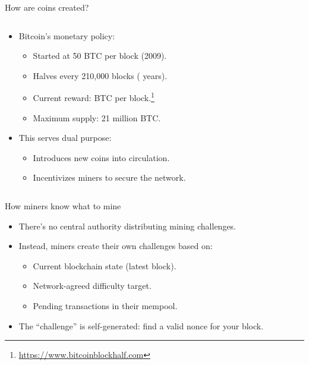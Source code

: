 \documentclass[aspectratio=169, lualatex, handout]{beamer}
\begin{document}
\begin{frame}{How are coins created?}
	\begin{columns}[c]
		\begin{column}{1\textwidth}
			\begin{itemize}
				\item Bitcoin's monetary policy:
				      \begin{itemize}
					      \item Started at 50 BTC per block (2009).
					      \item Halves every 210,000 blocks ( years).
					      \item Current reward:  BTC per block.\footnote{\url{https://www.bitcoinblockhalf.com}}
					      \item Maximum supply: 21 million BTC.
				      \end{itemize}
				\item This serves dual purpose:
				      \begin{itemize}
					      \item Introduces new coins into circulation.
					      \item Incentivizes miners to secure the network.
				      \end{itemize}
			\end{itemize}
		\end{column}
	\end{columns}
\end{frame}

\begin{frame}{How miners know what to mine}
	\begin{itemize}
		\item There's no central authority distributing mining challenges.
		\item Instead, miners create their own challenges based on:
		      \begin{itemize}
			      \item Current blockchain state (latest block).
			      \item Network-agreed difficulty target.
			      \item Pending transactions in their mempool.
		      \end{itemize}
		\item The ``challenge'' is self-generated: find a valid nonce for your block.
	\end{itemize}
\end{frame}
\end{document}
